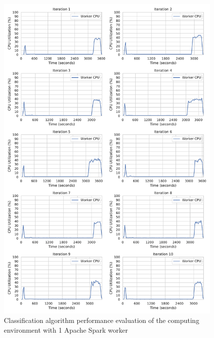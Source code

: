 \begin{figure}[h]
\centering
\includegraphics[scale=0.4]{images/07_evaluation/mortgage/mortgage_1_worker_cpu_performance}
\caption{Classification algorithm performance evaluation of the computing environment with 1 Apache Spark worker}
\label{fig:07_mortgage_static-cpu_results}
\end{figure}


